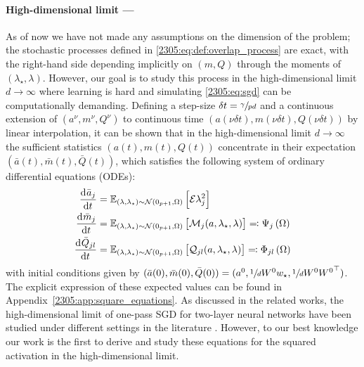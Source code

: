 \paragraph{High-dimensional limit ---} As of now we have not made any assumptions on the dimension of the problem; the stochastic processes defined in \eqref{2305:eq:def:overlap_process} are exact, with the right-hand side depending implicitly on $(m,Q)$ through the moments of $(\lambda_{\star}, \lambda)$. However, our goal is to study this process in the high-dimensional limit $d\to\infty$ where learning is hard and simulating \eqref{2305:eq:sgd} can be computationally demanding. Defining a step-size $\delta t = \sfrac{\gamma}{pd}$ and a continuous extension of $(a^{\nu},m^{\nu},Q^{\nu})$ to continuous time $(a(\nu\delta t),m(\nu\delta t),Q(\nu\delta t))$ by linear interpolation, it can be shown that in the high-dimensional limit $d\to\infty$ the sufficient statistics $(a(t),m(t),Q(t))$ concentrate in their expectation $(\bar{a}(t),\bar{m}(t),\bar{Q}(t))$, which satisfies the following system of ordinary differential equations (ODEs):
\begin{equation}\label{2305:eq:overlapping_ODE}
\begin{split}
    \dod{\bar{a}_j}{t} &= \mathbb E_{(\lf,\lf_\star)\sim\mathcal{N}(0_{\hids+1}, \Omega)}\left[\mathcal{E}\lambda_{j}^2\right] \\
    \dod{\bar{m}_j}{t} &= \mathbb E_{(\lf,\lf_\star)\sim\mathcal{N}(0_{\hids+1}, \Omega)}\left[\mathcal M_j(a,\lambda_{\star},\lambda)\right] \eqqcolon \Psi_j\left(\Omega\right) \\
    \dod{\bar{Q}_{jl}}{t} &= \mathbb E_{(\lf,\lf_\star)\sim\mathcal{N}(0_{\hids+1}, \Omega)}\left[\mathcal Q_{jl}(a,\lambda_{\star},\lambda)\right] \eqqcolon \Phi_{jl}\left(\Omega\right)
\end{split}
\end{equation}
with initial conditions given by $(\bar{a}(0), \bar{m}(0), \bar{Q}(0))=(a^{0}, \sfrac{1}{d}W^{0}w_{\star}, \sfrac{1}{d}W^{0}{W^{0}}^{\top})$.
The explicit expression of these expected values can be found in Appendix~\ref{2305:app:square_equations}.
As discussed in the related works, the high-dimensional limit of one-pass SGD for two-layer neural networks have been studied under different settings in the literature \citep{saad1996dynamics,goldt2019dynamics,reents1998self,tan2018phase,veiga2022phase,arnaboldi2023high,arous2022high,berthier2023learning}. However, to our best knowledge our work is the first to derive and study these equations for the squared activation in the high-dimensional limit. 

